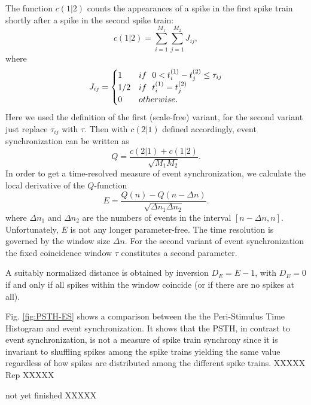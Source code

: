 \documentclass[10pt,twocolumn]{elsart5p}
\begin{document}
The function $c(1|2)$ counts the appearances of a spike in the first spike train shortly after a spike in the second spike train:
%
\begin{equation} \label{eq:Event-Count}
    c (1|2) = \sum_{i=1}^{M_1} \sum_{j=1}^{M_2} J_{ij},
\end{equation}
%
where
%
\begin{equation} \label{eq:Event-Synchronicity}
    J_{ij} = \begin{cases}
                      1     & {\rm if} ~~ 0 < t_i^{(1)} - t_j^{(2)} \leq \tau_{ij} \cr
                      1/2   & {\rm if} ~~ t^{(1)}_i = t^{(2)}_j \cr
                      0     & {\rm otherwise}.
                  \end{cases}
\end{equation}
%
Here we used the definition of the first (scale-free) variant, for the second variant just replace $\tau_{ij}$ with $\tau$. Then with $c(2|1)$ defined accordingly, event synchronization can be written as
%
\begin{equation} \label{eq:Event-Synchro}
    Q = \frac {c (2|1) + c (1|2)} {\sqrt{M_1 M_2}}.
\end{equation}
%
In order to get a time-resolved measure of event synchronization, we calculate the local derivative of the $Q$-function
%
\begin{equation} \label{eq:Window-Event-Synchro}
    E = \frac {Q (n) - Q (n-\Delta n)} {\sqrt{\Delta n_1 \Delta n_2}}.
\end{equation}
%
where $\Delta n_1$ and $\Delta n_2$ are the numbers of events in the interval $[n-\Delta n, n]$. Unfortunately, $E$ is not any longer parameter-free. The time resolution is governed by the window size $\Delta n$. For the second variant of event synchronization the fixed coincidence window $\tau$ constitutes a second parameter.

A suitably normalized distance is obtained by inversion $D_E=E-1$, with $D_E = 0$ if and only if all spikes within the window coincide (or if there are no spikes at all).

Fig. \ref{fig:PSTH-ES} shows a comparison between the the Peri-Stimulus Time Histogram and event synchronization. It shows that the PSTH, in contrast to event synchronization, is not a measure of spike train synchrony \citep{Kreuz11} since it is invariant to shuffling spikes among the spike trains yielding the same value regardless of how spikes are distributed among the different spike trains. XXXXX Rep XXXXX

not yet finished XXXXX
\end{document}

